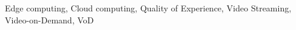 \documentclass[conference]{IEEEtran}
\begin{document}
\begin{abstract}
\end{abstract}

\begin{IEEEkeywords}
Edge computing, Cloud computing, Quality of Experience, Video Streaming, Video-on-Demand, VoD
\end{IEEEkeywords}
\end{document}
